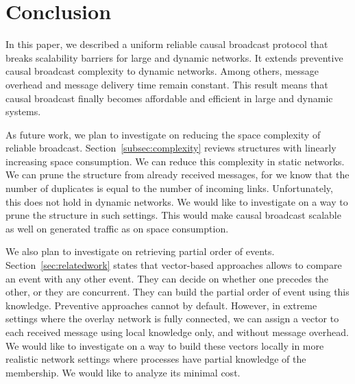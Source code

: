 
\section{Conclusion}
\label{sec:conclusion}

In this paper, we described a uniform reliable causal broadcast protocol that
breaks scalability barriers for large and dynamic networks. It extends
preventive causal broadcast complexity to dynamic networks. Among others,
message overhead and message delivery time remain constant.
This result means that causal broadcast finally becomes affordable and efficient
in large and dynamic systems.

As future work, we plan to investigate on reducing the space complexity of
reliable broadcast. Section~\ref{subsec:complexity} reviews structures with
linearly increasing space consumption. We can reduce this complexity in static
networks. We can prune the structure from already received messages, for we know
that the number of duplicates is equal to the number of incoming
links. Unfortunately, this does not hold in dynamic networks. We would like to
investigate on a way to prune the structure in such settings. This would make
causal broadcast scalable as well on generated traffic as on space consumption.

We also plan to investigate on retrieving partial order of
events. Section~\ref{sec:relatedwork} states that vector-based approaches allows
to compare an event with any other event. They can decide on whether one
precedes the other, or they are concurrent. They can build the partial order of
event using this knowledge. Preventive approaches cannot by default. However, in
extreme settings where the overlay network is fully connected, we can assign a
vector to each received message using local knowledge only, and without message
overhead. We would like to investigate on a way to build these vectors locally
in more realistic network settings where processes have partial knowledge of the
membership. We would like to analyze its minimal cost.

